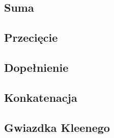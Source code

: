 \subsection{Suma}


\subsection{Przecięcie}


\subsection{Dopełnienie}


\subsection{Konkatenacja}


\subsection{Gwiazdka Kleenego}

